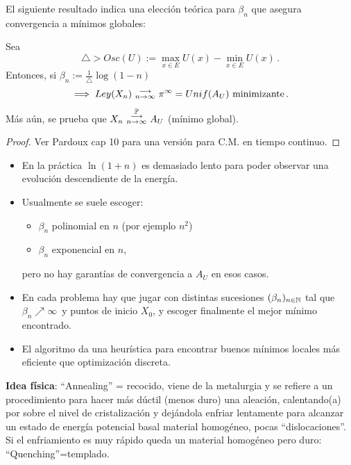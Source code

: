 El  siguiente resultado indica una elecci\'on  te\'orica para $\beta_n$ que asegura convergencia a m\'inimos globales: 


\begin{theorem}
Sea $$\triangle >Osc(U):=\displaystyle\max_{x\in E}U(x)-\min_{x\in E}U(x)\,.$$
Entonces, si $\beta_n:=\displaystyle\frac{1}{\triangle}\log(1-n)$
$$ \implies Ley(X_n)\mbox{ }\substack{\longrightarrow \\ n\to\infty}\mbox{ }\pi^\infty=Unif(A_U) \mbox{ minimizante}\,.$$
Más aún, se prueba que $X_n\mbox{ }\overset{\mathbb{P}}{\substack{\longrightarrow \\n \to \infty}}\mbox{ } A_U$ (mínimo global).
\end{theorem}
\begin{proof}
\gris
Ver Pardoux cap 10 \cite{pardoux} para una versión para C.M. en tiempo continuo. 
\negro
\end{proof}
\begin{remark}
\beforeitemize
\begin{itemize}
    \item En la práctica $\ln(1+n)$ es demasiado lento para poder observar una evoluci\'on descendiente de la energ\'ia.
    \item Usualmente se suele escoger:
    \begin{itemize}
        \item $\beta_n$ polinomial en $n$ (por ejemplo $n^2$)
        \item $\beta_n$ exponencial en $n$, 
    \end{itemize}
    pero no hay garantías de convergencia a $A_U$ en esos casos.
    \item En cada problema hay que jugar con distintas sucesiones $(\beta_n)_{n\in\mathbb{N}}$ tal que $\beta_n\nearrow \infty$\, y puntos de inicio $X_0$, y escoger finalmente el mejor m\'inimo encontrado. 
    \item El algoritmo da una heurística para encontrar buenos mínimos locales más eficiente que optimización discreta.
\end{itemize}
\end{remark}
\textbf{Idea física}:
\newline ``Annealing'' = recocido, viene de la metalurgia y se refiere a un  procedimiento para hacer más dúctil (menos duro) una aleación, calentando(a) por sobre el nivel de cristalización y dejándola enfriar lentamente para alcanzar un estado de energía potencial basal material homogéneo, pocas ``dislocaciones''.
\newline Si el enfriamiento es muy rápido queda un material homogéneo pero duro:
\newline ``Quenching''=templado.
